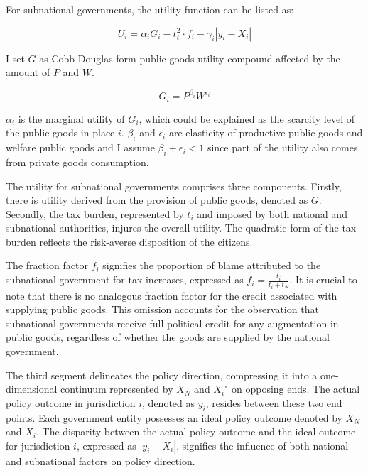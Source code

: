 For subnational governments, the utility function can be listed as:

\begin{equation}
    U_i=\alpha_i G_i-t_{i}^2\cdot f_i-\gamma_i\left|y_i-X_i\right|
\end{equation}

I set $G$ as  Cobb-Douglas form public goods utility compound affected by the amount of $P$ and $W$.

\begin{equation}
    G_i= P^{\beta_i} W^{\epsilon_i}\label{pgmatrix}
\end{equation}

$\alpha_i$ is the marginal utility of $G_i$, which could be explained as the scarcity level of the public goods in place $i$. $\beta_i$ and $\epsilon_i$ are elasticity of productive public goods and welfare public goods and I assume $\beta_i + \epsilon_i<1 $ since part of the utility also comes from private goods consumption.


The utility for subnational governments comprises three components. Firstly, there is utility derived from the provision of public goods, denoted as $G$. Secondly, the tax burden, represented by $t_i$ and imposed by both national and subnational authorities, injures the overall utility. The quadratic form of the tax burden reflects the risk-averse disposition of the citizens.

The fraction factor $f_i$ signifies the proportion of blame attributed to the subnational government for tax increases, expressed as $f_i=\frac{t_i}{t_i+t_N}$. It is crucial to note that there is no analogous fraction factor for the credit associated with supplying public goods. This omission accounts for the observation that subnational governments receive full political credit for any augmentation in public goods, regardless of whether the goods are supplied by the national government.%


The third segment delineates the policy direction, compressing it into a one-dimensional continuum represented by $X_N$ and $X_i$" on opposing ends. The actual policy outcome in jurisdiction $i$, denoted as $y_i$, resides between these two end points. Each government entity possesses an ideal policy outcome denoted by $X_N$ and $X_i$. The disparity between the actual policy outcome and the ideal outcome for jurisdiction $i$, expressed as $|y_i-X_i|$, signifies the influence of both national and subnational factors on policy direction.


